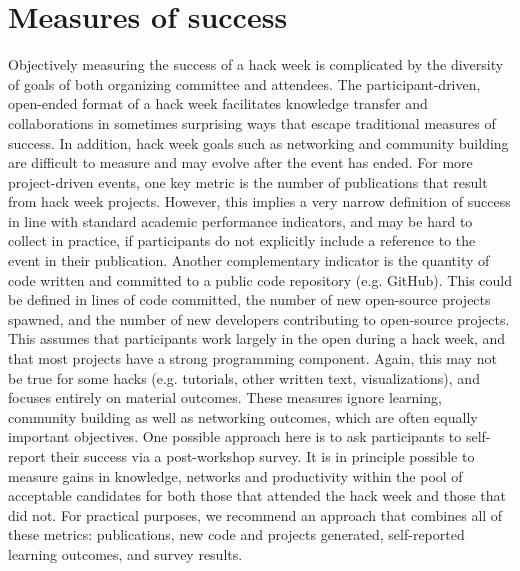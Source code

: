 \section*{Measures of success}

Objectively measuring the success of a hack week is complicated by the diversity of goals of both organizing committee and attendees.
The participant-driven, open-ended format of a hack week facilitates knowledge transfer and collaborations in sometimes surprising ways that escape traditional measures of success.
In addition, hack week goals such as networking and community building are difficult to measure and may evolve after the event has ended. 
For more project-driven events, one key metric is the number of publications that result from hack week projects.
However, this implies a very narrow definition of success in line with standard academic performance indicators, and may be hard to collect in practice, if participants do not explicitly include a reference to the event in their publication.
Another complementary indicator is the quantity of code written and committed to a public code repository (e.g. GitHub).
This could be defined in lines of code committed, the number of new open-source projects spawned, and the number of new developers contributing to open-source projects.
This assumes that participants work largely in the open during a hack week, and that most projects have a strong programming component.
Again, this may not be true for some hacks (e.g. tutorials, other written text, visualizations), and focuses entirely on material outcomes.
These measures ignore learning, community building as well as networking outcomes, which are often equally important objectives.
One possible approach here is to ask participants to self-report their success via a post-workshop survey.
It is in principle possible to measure gains in knowledge, networks and productivity within the pool of acceptable candidates for both those that attended the hack week and those that did not.
For practical purposes, we recommend an approach that combines all of these metrics: publications, new code and projects generated, self-reported learning outcomes, and survey results.

